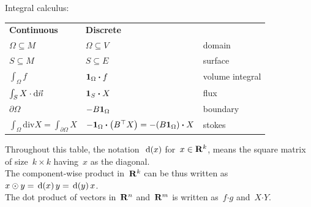 
\bigskip

Integral calculus:\newline
\begin{tabular}{|l|l|l}
	\cline{1-2}
	{\bf Continuous} & {\bf Discrete} &\\
	\cline{1-2}
	$\Omega\subseteq M$ & $\Omega\subseteq V$ & domain \\
	\cline{1-2}
	$S\subseteq M$ & $S\subseteq E$ & surface\\
	\cline{1-2}
	$\int_\Omega f$ & $\mathbf{1}_\Omega\boldsymbol\cdot f$ & volume integral\\
	\cline{1-2}
	$\int_S X\cdot\mathrm{d}\vec n$ & $\mathbf{1}_S\boldsymbol\cdot X$ & flux\\
	\cline{1-2}
	$\partial\Omega$ & $-B\mathbf{1}_\Omega$ & boundary\\
	\cline{1-2}
	$\int_\Omega{} X=\int_{\partial\Omega} X$
	& $-\mathbf{1}_\Omega\boldsymbol\cdot\left(B^\top X\right)
	= -(B\mathbf{1}_\Omega)\boldsymbol\cdot X$ & stokes \\
	\cline{1-2}
\end{tabular}

\bigskip

Throughout this table, the notation~$$ for~$x\in\R^k$, means the
square matrix of size~$k\times k$ having~$x$ as the diagonal.\\
The component-wise product in~$\R^k$ can be thus written as~$x\odot
y=y=x$.\\
The dot product of vectors in~$\R^n$ and~$\R^m$ is written
as~$f\boldsymbol\cdot g$ and~$X\boldsymbol\cdot Y$.

